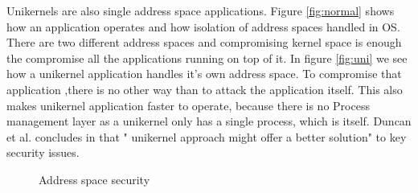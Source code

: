 Unikernels are also single address space applications. Figure \ref{fig:normal} shows how an application operates and how isolation of address spaces handled in OS. There are two different address spaces and compromising kernel space is enough the compromise all the applications running on top of it. In figure \ref{fig:uni} we see how a unikernel application handles it's own address space. To compromise that application ,there is no other way than to attack the application itself. This also makes unikernel application faster to operate, because there is no Process management layer as a unikernel only has a single process, which is itself. Duncan et al. concludes in \cite{Duncan2017} that " unikernel approach might offer a better solution" to key security issues.
\begin{figure}[htbp]
    \centering
    \hfill
    \caption{Address space security}\label{fig:single-space}
  \end{figure}

